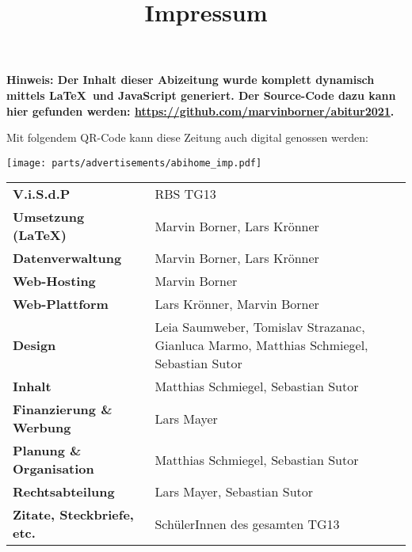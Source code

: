 \title{Impressum}


\textbf{Hinweis: Der Inhalt dieser Abizeitung wurde komplett dynamisch mittels \LaTeX\  und JavaScript generiert. Der Source-Code dazu kann hier gefunden werden: \url{https://github.com/marvinborner/abitur2021}.}

Mit folgendem QR-Code kann diese Zeitung auch digital genossen werden:

\begin{center}
\end{center}

\texttt{[image: parts/advertisements/abihome\_imp.pdf]}

\begin{table}[b]
	\begin{tabular}{ l l }
		\textbf{V.i.S.d.P}                 & RBS TG13                                                                                \\ %
		\textbf{Umsetzung (\LaTeX)}        & Marvin Borner, Lars Krönner                                                             \\
		\textbf{Datenverwaltung}           & Marvin Borner, Lars Krönner                                                             \\
		\textbf{Web-Hosting}               & Marvin Borner                                                                           \\
		\textbf{Web-Plattform}             & Lars Krönner, Marvin Borner                                                             \\
		\textbf{Design}                    & Leia Saumweber, Tomislav Strazanac, Gianluca Marmo, Matthias Schmiegel, Sebastian Sutor \\
		\textbf{Inhalt}                    & Matthias Schmiegel, Sebastian Sutor                                                     \\
		\textbf{Finanzierung \& Werbung}   & Lars Mayer                                                                              \\
		\textbf{Planung \& Organisation}   & Matthias Schmiegel, Sebastian Sutor                                                     \\
		\textbf{Rechtsabteilung}           & Lars Mayer, Sebastian Sutor                                                             \\
		\textbf{Zitate, Steckbriefe, etc.} & SchülerInnen des gesamten TG13
	\end{tabular}
\end{table}
